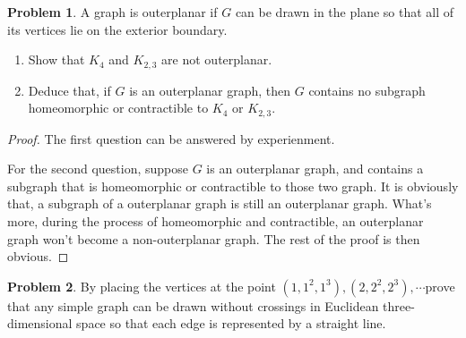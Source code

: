 \documentclass[a4paper,11pt]{article}%
\theoremstyle{remark}
\theoremstyle{definition}
\newtheorem{problem}{Problem}[subsection]
\begin{document}
\begin{problem}
    A graph is outerplanar if $G$ can be drawn in the plane so that all of its vertices lie on the exterior boundary.
    \begin{enumerate}
        \item Show that $K_4$ and $K_{2,3}$ are not outerplanar.
        \item Deduce that, if $G$ is an outerplanar graph, then $G$ contains no subgraph homeomorphic or contractible to $K_4$ or $K_{2,3}$.
    \end{enumerate}
    \begin{proof}
        The first question can be answered by experienment.

        For the second question, suppose $G$ is an outerplanar graph, and contains a subgraph that is homeomorphic or contractible to those two 
        graph. It is obviously that, a subgraph of a outerplanar graph is still an outerplanar graph. What's more, during the process of 
        homeomorphic and contractible, an outerplanar graph won't become a non-outerplanar graph. The rest of the proof is then obvious.
    \end{proof}
\end{problem}
\begin{problem}
    By placing the vertices at the point $(1,1^2,1^3),(2,2^2,2^3),\cdots$prove that any simple graph can be drawn without crossings in 
    Euclidean three-dimensional space so that each edge is represented by a straight line.
\end{problem}
\end{document}
